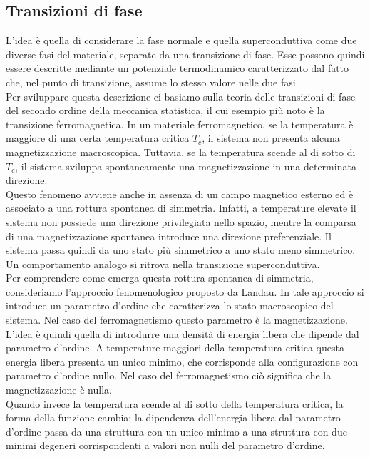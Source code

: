 \subsection{Transizioni di fase}
L'idea è quella di considerare la fase normale e quella superconduttiva come due diverse fasi del materiale, separate da una transizione di fase. Esse possono quindi essere descritte mediante un potenziale termodinamico caratterizzato dal fatto che, nel punto di transizione, assume lo stesso valore nelle due fasi.\\
Per sviluppare questa descrizione ci basiamo sulla teoria delle transizioni di fase del secondo ordine della meccanica statistica, il cui esempio più noto è la transizione ferromagnetica. In un materiale ferromagnetico, se la temperatura è maggiore di una certa temperatura critica $T_c$, il sistema non presenta alcuna magnetizzazione macroscopica. Tuttavia, se la temperatura scende al di sotto di $T_c$, il sistema sviluppa spontaneamente una magnetizzazione in una determinata direzione.\\
Questo fenomeno avviene anche in assenza di un campo magnetico esterno ed è associato a una rottura spontanea di simmetria. Infatti, a temperature elevate il sistema non possiede una direzione privilegiata nello spazio, mentre la comparsa di una magnetizzazione spontanea introduce una direzione preferenziale. Il sistema passa quindi da uno stato più simmetrico a uno stato meno simmetrico.\\
Un comportamento analogo si ritrova nella transizione superconduttiva.\\
Per comprendere come emerga questa rottura spontanea di simmetria, consideriamo l'approccio fenomenologico proposto da Landau. In tale approccio si introduce un parametro d'ordine che caratterizza lo stato macroscopico del sistema. Nel caso del ferromagnetismo questo parametro è la magnetizzazione.\\
L'idea è quindi quella di introdurre una densità di energia libera che dipende dal parametro d'ordine. A temperature maggiori della temperatura critica questa energia libera presenta un unico minimo, che corrisponde alla configurazione con parametro d'ordine nullo. Nel caso del ferromagnetismo ciò significa che la magnetizzazione è nulla.\\
Quando invece la temperatura scende al di sotto della temperatura critica, la forma della funzione cambia: la dipendenza dell'energia libera dal parametro d'ordine passa da una struttura con un unico minimo a una struttura con due minimi degeneri corrispondenti a valori non nulli del parametro d'ordine.

